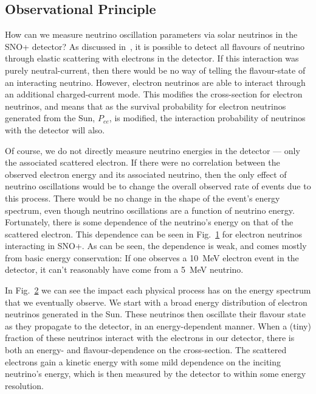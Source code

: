 \subsection{Observational Principle}
How can we measure neutrino oscillation parameters via solar neutrinos in the SNO+ detector? As discussed in~\label{}, %
it is possible to detect all flavours of neutrino through elastic scattering with electrons in the detector. If this interaction was purely neutral-current, then there would be no way of telling the flavour-state of an interacting neutrino. However, electron neutrinos are able to interact through an additional charged-current mode. This modifies the cross-section for electron neutrinos, and means that as the survival probability for electron neutrinos generated from the Sun, $P_{ee}$, is modified, the interaction probability of neutrinos with the detector will also.

Of course, we do not directly measure neutrino energies in the detector --- only the associated scattered electron. If there were no correlation between the observed electron energy and its associated neutrino, then the only effect of neutrino oscillations would be to change the overall observed rate of events due to this process. There would be no change in the shape of the event's energy spectrum, even though neutrino oscillations are a function of neutrino energy. Fortunately, there is some dependence of the neutrino's energy on that of the scattered electron. This dependence can be seen in Fig.~\ref{fig:nu_elec_energy_dependence} for \beight{} electron neutrinos interacting in SNO+. %
As can be seen, the dependence is weak, and comes mostly from basic energy conservation: If one observes a \SI{10}{\MeV} electron event in the detector, it can't reasonably have come from a \SI{5}{\MeV} neutrino.

\begin{figure}
    \centering
    \caption[]{}
    \label{fig:nu_elec_energy_dependence}
\end{figure}

\begin{figure}
    \centering
    \caption[]{}
    \label{fig:nu_elec_energy_dependence2}
\end{figure}

In Fig.~\ref{fig:nu_elec_energy_dependence2} we can see the impact each physical process has on the energy spectrum that we eventually observe. We start with a broad energy distribution of \beight{} electron neutrinos generated in the Sun. These neutrinos then oscillate their flavour state as they propagate to the detector, in an energy-dependent manner. When a (tiny) fraction of these neutrinos interact with the electrons in our detector, there is both an energy- and flavour-dependence on the cross-section. The scattered electrons gain a kinetic energy with some mild dependence on the inciting neutrino's energy, which is then measured by the detector to within some energy resolution.

